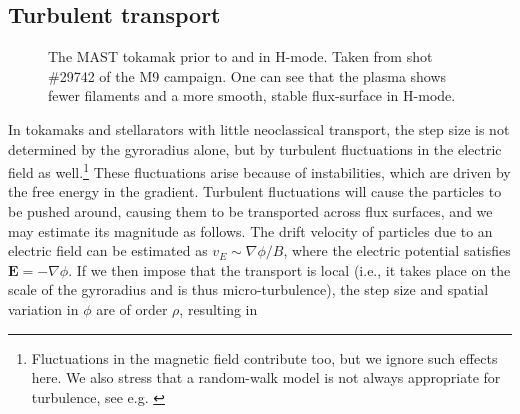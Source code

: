\subsection{Turbulent transport}
\begin{figure}[!b]
  \centering
  \hfill
  \caption{The MAST tokamak prior to and in H-mode. Taken from shot \#29742 of the M9 campaign. One can see that the plasma shows fewer filaments and a more smooth, stable flux-surface in H-mode.}
  \label{fig: L-H mode in MAST}
\end{figure}
In tokamaks and stellarators with little neoclassical transport, the step size is not determined by the gyroradius alone, but by turbulent fluctuations in the electric field as well.\footnote{Fluctuations in the magnetic field contribute too, but we ignore such effects here. We also stress that a random-walk model is not always appropriate for turbulence, see e.g. \cite{del2005nondiffusive,mier2008characterization,del2010non,dif2010validity,nastac2022stochastic}} These fluctuations arise because of instabilities, which are driven by the free energy in the gradient. Turbulent fluctuations will cause the particles to be pushed around, causing them to be transported across flux surfaces, and we may estimate its magnitude as follows. The drift velocity of particles due to an electric field can be estimated as $v_E \sim \nabla \phi/B$, where the electric potential satisfies $\boldsymbol{E} = - \nabla \phi$. If we then impose that the transport is local (i.e., it takes place on the scale of the gyroradius and is thus micro-turbulence), the step size and spatial variation in $\phi$ are of order $\rho$, resulting in
